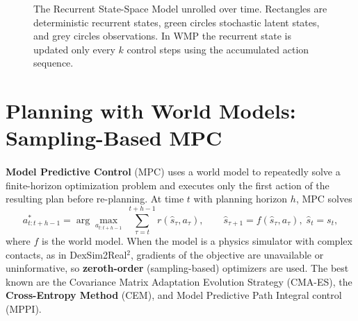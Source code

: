 \documentclass[12pt,a4paper,final]{extreport}
\begin{document}
\begin{figure}[htbp]
\centering
{}
\caption{The Recurrent State-Space Model unrolled over time. Rectangles are deterministic recurrent states, green circles stochastic latent states, and grey circles observations. In WMP the recurrent state is updated only every $k$ control steps using the accumulated action sequence.}
\label{fig:rssm}
\end{figure}

\section{Planning with World Models: Sampling-Based MPC}

\paragraph{} \textbf{Model Predictive Control} (MPC) uses a world model to repeatedly solve a finite-horizon optimization problem and executes only the first action of the resulting plan before re-planning. At time $t$ with planning horizon $h$, MPC solves
\begin{equation}
a^{*}_{t:t+h-1}=\arg\max_{a_{t:t+h-1}}\;\sum_{\tau=t}^{t+h-1} r(\hat{s}_\tau,a_\tau),\qquad \hat{s}_{\tau+1}=f(\hat{s}_\tau,a_\tau),\;\hat{s}_t=s_t,
\label{eq:mpc}
\end{equation}
where $f$ is the world model. When the model is a physics simulator with complex contacts, as in DexSim2Real$^2$, gradients of the objective are unavailable or uninformative, so \textbf{zeroth-order} (sampling-based) optimizers are used. The best known are the Covariance Matrix Adaptation Evolution Strategy (CMA-ES), the \textbf{Cross-Entropy Method} (CEM), and Model Predictive Path Integral control (MPPI).
\end{document}
